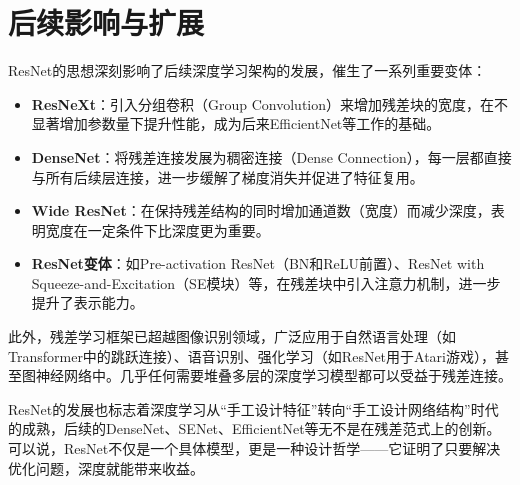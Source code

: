 \section{后续影响与扩展}

ResNet的思想深刻影响了后续深度学习架构的发展，催生了一系列重要变体：

\begin{itemize}
    \item \textbf{ResNeXt}：引入分组卷积（Group Convolution）来增加残差块的宽度，在不显著增加参数量下提升性能，成为后来EfficientNet等工作的基础。
    \item \textbf{DenseNet}：将残差连接发展为稠密连接（Dense Connection），每一层都直接与所有后续层连接，进一步缓解了梯度消失并促进了特征复用。
    \item \textbf{Wide ResNet}：在保持残差结构的同时增加通道数（宽度）而减少深度，表明宽度在一定条件下比深度更为重要。
    \item \textbf{ResNet变体}：如Pre-activation ResNet（BN和ReLU前置）、ResNet with Squeeze-and-Excitation（SE模块）等，在残差块中引入注意力机制，进一步提升了表示能力。
\end{itemize}

此外，残差学习框架已超越图像识别领域，广泛应用于自然语言处理（如Transformer中的跳跃连接）、语音识别、强化学习（如ResNet用于Atari游戏），甚至图神经网络中。几乎任何需要堆叠多层的深度学习模型都可以受益于残差连接。

ResNet的发展也标志着深度学习从“手工设计特征”转向“手工设计网络结构”时代的成熟，后续的DenseNet、SENet、EfficientNet等无不是在残差范式上的创新。可以说，ResNet不仅是一个具体模型，更是一种设计哲学——它证明了只要解决优化问题，深度就能带来收益。